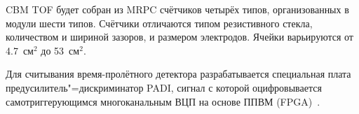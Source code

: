 CBM TOF будет собран из MRPC счётчиков четырёх типов, организованных в модули шести типов.
Счётчики отличаются типом резистивного стекла, количеством и шириной зазоров, и размером электродов. Ячейки варьируются от 4.7~см$^2$ до 53~см$^2$.

Для считывания время-пролётного детектора разрабатывается специальная плата предусилитель"=дискриминатор PADI, сигнал с которой оцифровывается самотриггерующимся многоканальным ВЦП на основе ППВМ (FPGA)~\cite{PADI}.



